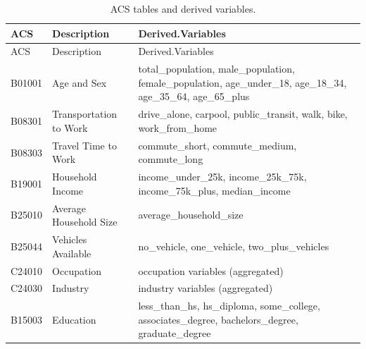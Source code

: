 \documentclass[
  number,
  review,
  3p]{elsarticle}
\begin{document}
\begin{longtable}[]{@{}
  >{\raggedright\arraybackslash}p{}
  >{\raggedright\arraybackslash}p{}
  >{\raggedright\arraybackslash}p{}@{}}
\caption{ACS tables and derived variables.}\tabularnewline
\toprule\noalign{}
\begin{minipage}[b]{\linewidth}\raggedright
ACS
\end{minipage} & \begin{minipage}[b]{\linewidth}\raggedright
Description
\end{minipage} & \begin{minipage}[b]{\linewidth}\raggedright
Derived.Variables
\end{minipage} \\
\midrule\noalign{}
\endfirsthead
\toprule\noalign{}
\begin{minipage}[b]{\linewidth}\raggedright
ACS
\end{minipage} & \begin{minipage}[b]{\linewidth}\raggedright
Description
\end{minipage} & \begin{minipage}[b]{\linewidth}\raggedright
Derived.Variables
\end{minipage} \\
\midrule\noalign{}
\endhead
\bottomrule\noalign{}
\endlastfoot
B01001 & Age and Sex & total\_population, male\_population,
female\_population, age\_under\_18, age\_18\_34, age\_35\_64,
age\_65\_plus \\
B08301 & Transportation to Work & drive\_alone, carpool,
public\_transit, walk, bike, work\_from\_home \\
B08303 & Travel Time to Work & commute\_short, commute\_medium,
commute\_long \\
B19001 & Household Income & income\_under\_25k, income\_25k\_75k,
income\_75k\_plus, median\_income \\
B25010 & Average Household Size & average\_household\_size \\
B25044 & Vehicles Available & no\_vehicle, one\_vehicle,
two\_plus\_vehicles \\
C24010 & Occupation & occupation variables (aggregated) \\
C24030 & Industry & industry variables (aggregated) \\
B15003 & Education & less\_than\_hs, hs\_diploma, some\_college,
associates\_degree, bachelors\_degree, graduate\_degree \\

\end{longtable}
\end{document}
